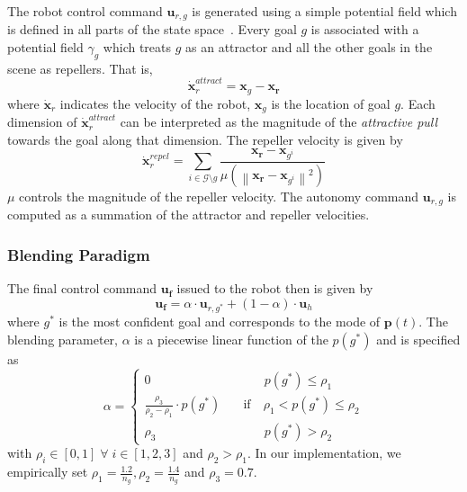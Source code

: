 \documentclass[conference]{IEEEtran}
\newcommand{\norm}[1]{\left\lVert#1\right\rVert}
\begin{document}
The robot control command $\boldsymbol{u}_{r,g}$ is generated using a simple potential field which is defined in all parts of the state space~\citep{khatib1986real}. Every goal $g$ is associated with a potential field $\gamma_g$ which treats $g$ as an attractor and all the other goals in the scene as repellers. That is,
\begin{equation*}
\dot{\boldsymbol{x}}_r^{attract} = \boldsymbol{x}_{g} - \boldsymbol{x_r}
\end{equation*}
 where $\dot{\boldsymbol{x}}_r$ indicates the velocity of the robot, $\boldsymbol{x}_{g}$ is the location of goal $g$. Each dimension of $\dot{\boldsymbol{x}}_r^{attract}$ can be interpreted as the magnitude of the \textit{attractive pull} towards the goal along that dimension. 
The repeller velocity is given by
\begin{equation*}
\dot{\boldsymbol{x}}_r^{repel} = \sum_{i \in \mathcal{G} \setminus g} \frac{\boldsymbol{x_r} - \boldsymbol{x}_{g^i}}{\mu(\norm{\boldsymbol{x_r} - \boldsymbol{x}_{g^i}}^2)}
\end{equation*}
 $\mu$ controls the magnitude of the repeller velocity. The autonomy command $\boldsymbol{u}_{r,g}$ is computed as a summation of the attractor and repeller velocities.
\subsubsection{Blending Paradigm}\label{sssec:blending}
The final control command $\boldsymbol{u_f}$ issued to the robot then is given by
\begin{equation*}
\boldsymbol{u_f} = \alpha\cdot \boldsymbol{u}_{r,g^*} + (1 - \alpha)\cdot \boldsymbol{u}_h
\end{equation*}
where $g^*$ is the most confident goal and corresponds to the mode of $\boldsymbol{p}(t)$. The blending parameter, $\alpha$ is a piecewise linear function of the $p(g^*)$ and is specified as
$$
\alpha = \left\{
\begin{array}{ll}
0 & \quad\quad~~~ p(g^*) \leq \rho_1 \\
\frac{\rho_3}{\rho_2 - \rho_1}\cdot p(g^*) &  \quad \text{if}\quad \rho_1 < p(g^*) \leq \rho_2  \\
\rho_3 & \quad\quad~~~ p(g^*) > \rho_2 	
\end{array}
\right.
$$
with $\rho_i \in [0, 1] \;\forall\; i \in [1,2,3]$ and $ \rho_2 > \rho_1$. 
In our implementation, we empirically set $\rho_1 = \frac{1.2}{n_g}, \rho_2 = \frac{1.4}{n_g}$ and $ \rho_3 = 0.7$.
\end{document}
